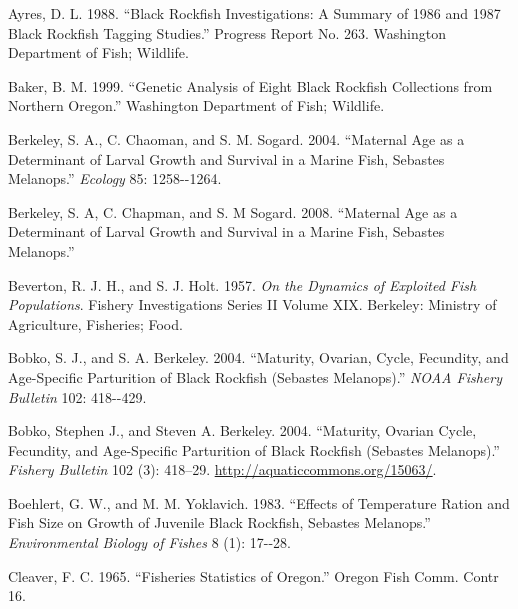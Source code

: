 \documentclass[11pt,
  english,
  letterpaper,
]{article}
\newlength{\cslhangindent}
\newenvironment{CSLReferences}[2] %
 {%
  \setlength{\parindent}{0pt}
  \ifodd #1 \everypar{\setlength{\hangindent}{\cslhangindent}}\ignorespaces\fi
  \ifnum #2 > 0
  \setlength{\parskip}{#2\baselineskip}
  \fi
 }%
 {}
\begin{document}
\hypertarget{refs}{}
\begin{CSLReferences}{1}{0}
\leavevmode{}%
Ayres, D. L. 1988. {``Black Rockfish Investigations: A Summary of 1986 and 1987 Black Rockfish Tagging Studies.''} Progress Report No. 263. Washington Department of Fish; Wildlife.

\leavevmode{}%
Baker, B. M. 1999. {``Genetic Analysis of Eight Black Rockfish Collections from Northern Oregon.''} Washington Department of Fish; Wildlife.

\leavevmode{}%
Berkeley, S. A., C. Chaoman, and S. M. Sogard. 2004. {``Maternal Age as a Determinant of Larval Growth and Survival in a Marine Fish, Sebastes Melanops.''} \emph{Ecology} 85: 1258-\/-1264.

\leavevmode{}%
Berkeley, S. A, C. Chapman, and S. M Sogard. 2008. {``Maternal Age as a Determinant of Larval Growth and Survival in a Marine Fish, Sebastes Melanops.''}

\leavevmode{}%
Beverton, R. J. H., and S. J. Holt. 1957. \emph{On the Dynamics of Exploited Fish Populations}. Fishery {Investigations} {Series II} {Volume XIX}. Berkeley: Ministry of Agriculture, Fisheries; Food.

\leavevmode{}%
Bobko, S. J., and S. A. Berkeley. 2004. {``Maturity, Ovarian, Cycle, Fecundity, and Age-Specific Parturition of Black Rockfish (Sebastes Melanops).''} \emph{NOAA Fishery Bulletin} 102: 418-\/-429.

\leavevmode{}%
Bobko, Stephen J., and Steven A. Berkeley. 2004. {``Maturity, Ovarian Cycle, Fecundity, and Age-Specific Parturition of Black Rockfish (Sebastes Melanops).''} \emph{Fishery Bulletin} 102 (3): 418--29. \url{http://aquaticcommons.org/15063/}.

\leavevmode{}%
Boehlert, G. W., and M. M. Yoklavich. 1983. {``Effects of Temperature Ration and Fish Size on Growth of Juvenile Black Rockfish, Sebastes Melanops.''} \emph{Environmental Biology of Fishes} 8 (1): 17-\/-28.

\leavevmode{}%
Cleaver, F. C. 1965. {``Fisheries Statistics of Oregon.''} Oregon Fish Comm. Contr 16.


\end{CSLReferences}
\end{document}
